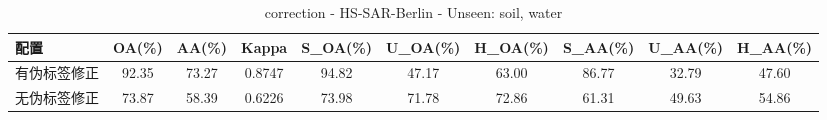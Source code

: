\begin{table}[htbp]
\centering
\caption{correction - HS-SAR-Berlin - Unseen: soil, water}
\begin{tabular}{lccccccccc}
\hline
配置 & OA(\%) & AA(\%) & Kappa & S\_OA(\%) & U\_OA(\%) & H\_OA(\%) & S\_AA(\%) & U\_AA(\%) & H\_AA(\%) \\
\hline
有伪标签修正 & 92.35 & 73.27 & 0.8747 & 94.82 & 47.17 & 63.00 & 86.77 & 32.79 & 47.60 \\
无伪标签修正 & 73.87 & 58.39 & 0.6226 & 73.98 & 71.78 & 72.86 & 61.31 & 49.63 & 54.86 \\
\hline
\end{tabular}
\end{table}